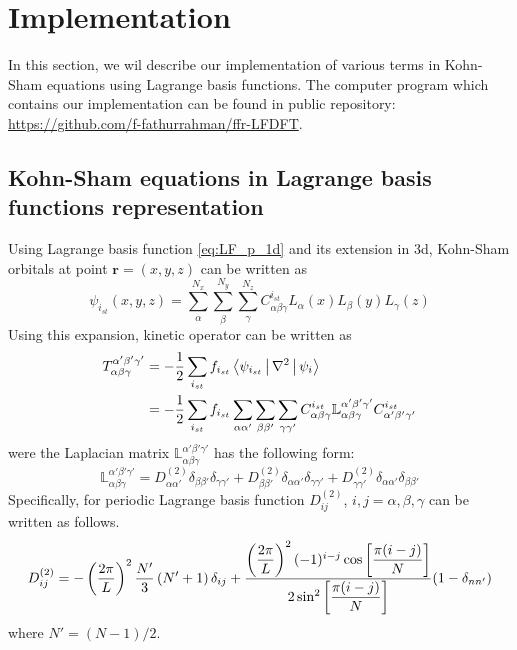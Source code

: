 \section{Implementation}

In this section, we wil describe our implementation of various terms 
in Kohn-Sham equations using Lagrange basis functions.
The computer program which contains our implementation can be found in public
repository: \url{https://github.com/f-fathurrahman/ffr-LFDFT}.

\subsection{Kohn-Sham equations in Lagrange basis functions representation}

Using Lagrange basis function \ref{eq:LF_p_1d} and its extension in 3d, Kohn-Sham orbitals
at point $\mathbf{r} = (x,y,z)$ can be written as
\begin{equation}
\psi_{i_{st}}(x,y,z) = \sum_{\alpha}^{N_x} \sum_{\beta}^{N_y} \sum_{\gamma}^{N_z}
C_{\alpha\beta\gamma}^{i_{st}} L_{\alpha}(x) L_{\beta}(y) L_{\gamma}(z)
\end{equation}
%
Using this expansion, kinetic operator can be written as
\begin{align}
T_{\alpha\beta\gamma}^{\alpha'\beta'\gamma'} & = -\frac{1}{2} \sum_{i_{st}} f_{i_{st}}
\Braket{ \psi_{i_{st}} | \nabla^2 | \psi_{i} } \\
& =
-\frac{1}{2}
\sum_{i_{st}} f_{i_{st}} \sum_{\alpha\alpha'} \sum_{\beta\beta'} \sum_{\gamma\gamma'}
C^{i_{st}}_{\alpha\beta\gamma} \mathbb{L}_{\alpha\beta\gamma}^{\alpha'\beta'\gamma'}
C^{i_{st}}_{\alpha'\beta'\gamma'}
\end{align}
%
were the Laplacian matrix $\mathbb{L}_{\alpha\beta\gamma}^{\alpha'\beta'\gamma'}$
has the following form:
\begin{equation}
\mathbb{L}_{\alpha\beta\gamma}^{\alpha'\beta'\gamma'} =
D^{(2)}_{\alpha\alpha'}\delta_{\beta\beta'}\delta_{\gamma\gamma'} +
D^{(2)}_{\beta\beta'}\delta_{\alpha\alpha'}\delta_{\gamma\gamma'} +
D^{(2)}_{\gamma\gamma'}\delta_{\alpha\alpha'}\delta_{\beta\beta'}
\end{equation}
%
Specifically, for periodic Lagrange basis function $D^{(2)}_{ij}$, $i, j = \alpha, \beta, \gamma$
can be written as follows.
\begin{equation}
D^{(2)}_{ij} = -\left( \frac{2\pi}{L} \right)^2 \frac{N'}{3} \left( N' + 1 \right) \delta_{ij} \\
+ \dfrac{ \left(\dfrac{2\pi}{L}\right)^2 (-1)^{i-j}\cos\left[\dfrac{\pi(i-j)}{N}\right]}
{2\sin^2\left[\dfrac{\pi(i-j)}{N}\right]}
(1-\delta_{nn'})
\label{eq:kin1d_p}
\end{equation}
where $N' = (N-1)/2$.

